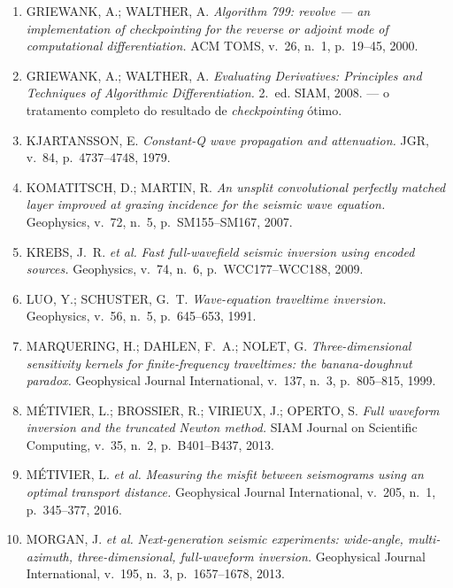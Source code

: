 \documentclass[11pt,a4paper,oneside]{report}
\begin{document}
\begin{enumerate}[leftmargin=*, itemsep=3pt]
\item GRIEWANK, A.; WALTHER, A. \emph{Algorithm 799: revolve --- an
implementation of checkpointing for the reverse or adjoint mode of
computational differentiation.} ACM TOMS, v.~26, n.~1, p.~19--45, 2000.

\item GRIEWANK, A.; WALTHER, A. \emph{Evaluating Derivatives: Principles and
Techniques of Algorithmic Differentiation.} 2.~ed. SIAM, 2008. --- o
tratamento completo do resultado de \emph{checkpointing} \'otimo.

\item KJARTANSSON, E. \emph{Constant-Q wave propagation and attenuation.}
JGR, v.~84, p.~4737--4748, 1979.

\item KOMATITSCH, D.; MARTIN, R. \emph{An unsplit convolutional perfectly
matched layer improved at grazing incidence for the seismic wave equation.}
Geophysics, v.~72, n.~5, p.~SM155--SM167, 2007.

\item KREBS, J.~R. \emph{et al.} \emph{Fast full-wavefield seismic inversion
using encoded sources.} Geophysics, v.~74, n.~6, p.~WCC177--WCC188, 2009.

\item LUO, Y.; SCHUSTER, G.~T. \emph{Wave-equation traveltime inversion.}
Geophysics, v.~56, n.~5, p.~645--653, 1991.

\item MARQUERING, H.; DAHLEN, F.~A.; NOLET, G. \emph{Three-dimensional
sensitivity kernels for finite-frequency traveltimes: the banana-doughnut
paradox.} Geophysical Journal International, v.~137, n.~3, p.~805--815, 1999.

\item M\'ETIVIER, L.; BROSSIER, R.; VIRIEUX, J.; OPERTO, S.
\emph{Full waveform inversion and the truncated Newton method.} SIAM Journal
on Scientific Computing, v.~35, n.~2, p.~B401--B437, 2013.

\item M\'ETIVIER, L. \emph{et al.} \emph{Measuring the misfit between
seismograms using an optimal transport distance.} Geophysical Journal
International, v.~205, n.~1, p.~345--377, 2016.

\item MORGAN, J. \emph{et al.} \emph{Next-generation seismic experiments:
wide-angle, multi-azimuth, three-dimensional, full-waveform inversion.}
Geophysical Journal International, v.~195, n.~3, p.~1657--1678, 2013.


\end{enumerate}
\end{document}
